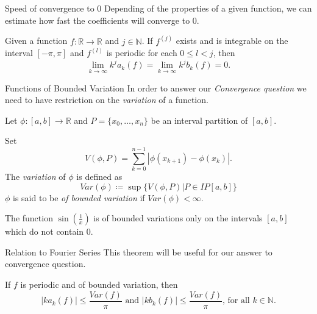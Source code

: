 \documentclass{beamer}
\newcommand{\NN}{{\mathbb N}} %
\newcommand{\RR}{{\mathbb R}} %
\begin{document}
\begin{frame}{Speed of convergence to 0}
    Depending of the properties of a given function, we can estimate how fast the coefficients will converge to 0.
    \begin{theorem}
        Given a function \( f : \mathbb{R} \to \mathbb{R} \) and \( j \in \mathbb{N} \). If \( f^{(j)} \) exists and is integrable on the interval \([-\pi, \pi]\) and \( f^{(l)} \) is periodic for each \( 0 \leq l < j \), then
\[
\lim_{{k \to \infty}}k^ja_k(f)  = \lim_{{k \to \infty}} k^jb_k(f) = 0.
\]

    \end{theorem}
\end{frame}



\begin{frame}{Functions of Bounded Variation}
\small
    In order to answer our \emph{Convergence question} we need to have restriction on the \emph{variation} of a function.

    \begin{definition}
    Let $\phi : [a,b] \to \RR$ and $P = \{x_0, \dots, x_n\}$ be an interval partition of $[a,b]$.

Set
\[
V(\phi,P) = \sum_{k=0}^{n-1}|\phi(x_{k+1}) - \phi(x_{k})|.
\]
The \emph{variation} of $\phi$ is defined as
\begin{equation*}
    Var(\phi) \coloneqq \sup\{V(\phi,P)| P \in IP[a,b]\}
\end{equation*}
$\phi$ is said to be \emph{of bounded variation} if $Var(\phi) < \infty$.
\end{definition}

\begin{example}
    The function $\sin(\frac{1}{x})$ is of bounded variations only on the intervals $[a,b]$ which do not contain 0.
\end{example}
    
\end{frame}


\begin{frame}{Relation to Fourier Series}
This theorem will be useful for our answer to convergence question.
    \begin{theorem}\label{growth of ceof. of bdd. var.}
    If $f$ is periodic and of bounded variation, then
    \[
    |ka_k(f)|\leq \frac{Var(f)}{\pi}  \text{ and }  |kb_k(f)| \leq \frac{Var(f)}{\pi} \text{, for all $k \in \NN$.}
    \]
\end{theorem}
\end{frame}
\end{document}
